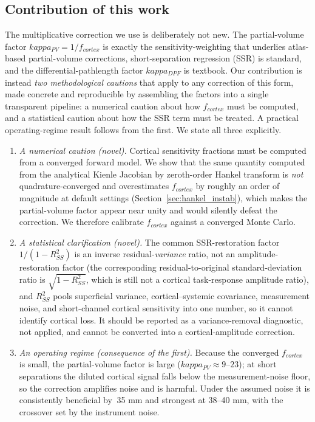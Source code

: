 \documentclass[11pt]{article}
\def\kappa{kappa}%
\def\sim{~}%
\def\mathrm#1{#1}%
\def\,{ }%
\begin{document}
\subsection{Contribution of this work}

The multiplicative correction we use is deliberately not new. The partial-volume factor $\kappa_{\mathrm{PV}}=1/f_{\mathrm{cortex}}$ is exactly the sensitivity-weighting that underlies atlas-based partial-volume corrections\cite{r10,r13}, short-separation regression (SSR) is standard\cite{r18,r19}, and the differential-pathlength factor $\kappa_{\mathrm{DPF}}$ is textbook. Our contribution is instead \emph{two methodological cautions} that apply to any correction of this form, made concrete and reproducible by assembling the factors into a single transparent pipeline: a numerical caution about how $f_{\mathrm{cortex}}$ must be computed, and a statistical caution about how the SSR term must be treated. A practical operating-regime result follows from the first. We state all three explicitly.

\begin{enumerate}
\item \emph{A numerical caution (novel).} Cortical sensitivity fractions must be computed from a converged forward model. We show that the same quantity computed from the analytical Kienle Jacobian by zeroth-order Hankel transform is \emph{not} quadrature-converged and overestimates $f_{\mathrm{cortex}}$ by roughly an order of magnitude at default settings (Section~\ref{sec:hankel_instab}), which makes the partial-volume factor appear near unity and would silently defeat the correction. We therefore calibrate $f_{\mathrm{cortex}}$ against a converged Monte Carlo.
\item \emph{A statistical clarification (novel).} The common SSR-restoration factor $1/(1-R^2_{\mathrm{SS}})$ is an inverse residual-\emph{variance} ratio, not an amplitude-restoration factor (the corresponding residual-to-original standard-deviation ratio is $\sqrt{1-R^2_{\mathrm{SS}}}$, which is still not a cortical task-response amplitude ratio), and $R^2_{\mathrm{SS}}$ pools superficial variance, cortical--systemic covariance, measurement noise, and short-channel cortical sensitivity into one number, so it cannot identify cortical loss. It should be reported as a variance-removal diagnostic, not applied, and cannot be converted into a cortical-amplitude correction.
\item \emph{An operating regime (consequence of the first).} Because the converged $f_{\mathrm{cortex}}$ is small, the partial-volume factor is large ($\kappa_{\mathrm{PV}}\approx9$--$23$); at short separations the diluted cortical signal falls below the measurement-noise floor, so the correction amplifies noise and is harmful. Under the assumed noise it is consistently beneficial by $\sim$35\,mm and strongest at 38--40\,mm, with the crossover set by the instrument noise.
\end{enumerate}
\end{document}
